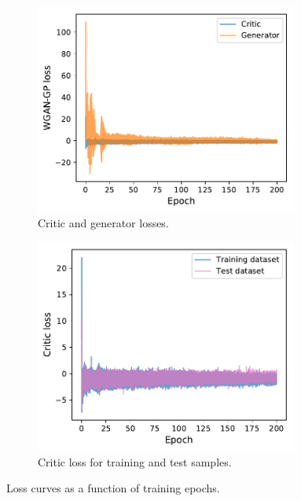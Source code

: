 \begin{figure}
    \centering
    \begin{subfigure}{0.49\textwidth}
        \centering
        \hspace{-1cm} %
        \includegraphics[width=0.95\textwidth]{chapter4/losses.pdf}
        \caption{Critic and generator losses.}
    \end{subfigure}
    \hfill
    \begin{subfigure}{0.49\textwidth}
        \centering
        \hspace{-1cm} %
        \includegraphics[width=0.95\textwidth]{chapter4/val_loss.pdf}
        \caption{Critic loss for training and test samples.}
        \label{fig:gan_losses:test}
    \end{subfigure}
    \caption{Loss curves as a function of training epochs.}
    \label{fig:gan_losses}
\end{figure}

